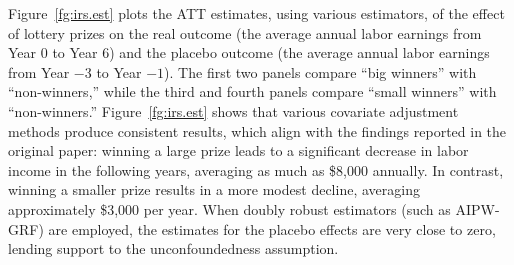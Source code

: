 \documentclass[letterpaper,12pt,leqno]{article}
\begin{document}
Figure~\ref{fg:irs.est} plots the ATT estimates, using various estimators, of the effect of lottery prizes on the real outcome (the average annual labor earnings from Year $0$ to Year $6$) and the placebo outcome (the average annual labor earnings from Year $-3$ to Year $-1$). The first two panels compare ``big winners'' with ``non-winners,'' while the third and fourth panels compare ``small winners'' with ``non-winners.'' Figure~\ref{fg:irs.est} shows that various covariate adjustment methods produce consistent results, which align with the findings reported in the original paper: winning a large prize leads to a significant decrease in labor income in the following years, averaging as much as \$8,000 annually. In contrast, winning a smaller prize results in a more modest decline, averaging approximately \$3,000 per year. When doubly robust estimators (such as AIPW-GRF) are employed, the estimates for the placebo effects are very close to zero, lending support to the unconfoundedness assumption.
\end{document}
